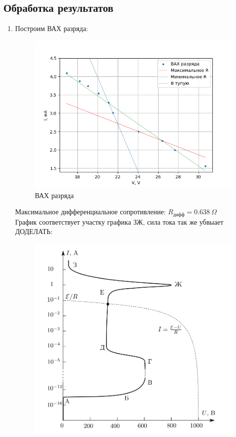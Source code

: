 \documentclass[11pt,a4paper]{article}
\begin{document}
\subsection*{Обработка результатов}
\begin{enumerate}
  \item Построим ВАХ разряда:
  \begin{figure}[h!]
    \includegraphics*[width=\textwidth]{p1.png}
    \caption{ВАХ разряда}
    \label{fig:graph.p1}
  \end{figure}
  Максимальное дифференциальное сопротивление: $R_{дифф} = 0.638\ \Omega$
  \\График соответствует участку графика ЗЖ, сила тока так же убвыает ДОДЕЛАТЬ:
  \begin{figure}[h!]
    \includegraphics*[width=\textwidth]{2023-09-07-12-28-48.png}

\end{figure}
\end{enumerate}
\end{document}
